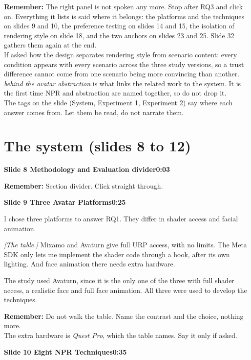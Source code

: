 \documentclass[11pt,a4paper]{article}
\newcommand{\slidehead}[3]{%
  \needspace{5\baselineskip}
  \vspace{0.9em}
  \noindent\colorbox{knblue}{\parbox{0.978\textwidth}{\vspace{1pt}\color{white}\textbf{Slide #1 \quad #2}\hfill\textbf{#3}\vspace{1pt}}}
  \vspace{0.35em}\par}
\newcommand{\remind}[1]{%
  \vspace{0.15em}
  \noindent\colorbox{knlight}{\parbox{0.972\textwidth}{\small\color{knblue}\textbf{Remember:} #1}}
  \vspace{0.2em}\par}
\newcommand{\pointto}[1]{{\color{knaccent}\textit{[#1]}}}
\begin{document}
\remind{The right panel is not spoken any more. Stop after RQ3 and click on. Everything it lists is said where it belongs: the platforms and the techniques on slides 9 and 10, the preference testing on slides 14 and 15, the isolation of rendering style on slide 18, and the two anchors on slides 23 and 25. Slide 32 gathers them again at the end.\\[0.4em] If asked how the design separates rendering style from scenario content: every condition appears with every scenario across the three study versions, so a trust difference cannot come from one scenario being more convincing than another.\\[0.4em] \emph{behind the avatar abstraction} is what links the related work to the system. It is the first time NPR and abstraction are named together, so do not drop it.\\[0.4em] The tags on the slide (System, Experiment 1, Experiment 2) say where each answer comes from. Let them be read, do not narrate them.}

\section*{\color{knblue}The system (slides 8 to 12)}

\slidehead{8}{Methodology and Evaluation divider}{0:03}

\remind{Section divider. Click straight through.}

\slidehead{9}{Three Avatar Platforms}{0:25}

I chose three platforms to answer RQ1. They differ in shader access and facial animation.

\pointto{The table.} Mixamo and Avaturn give full URP access, with no limits. The Meta SDK only lets me implement the shader code through a hook, after its own lighting. And face animation there needs extra hardware.

The study used Avaturn, since it is the only one of the three with full shader access, a realistic face and full face animation. All three were used to develop the techniques.

\remind{Do not walk the table. Name the contrast and the choice, nothing more.\\[0.4em] The extra hardware is \emph{Quest Pro}, which the table names. Say it only if asked.}

\slidehead{10}{Eight NPR Techniques}{0:35}
\end{document}
